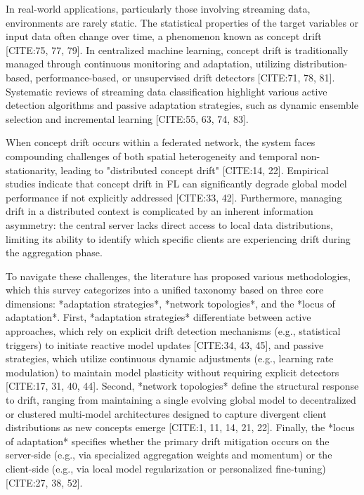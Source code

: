 \documentclass[journal]{IEEEtran}
\begin{document}
In real-world applications, particularly those involving streaming data, environments are rarely static. The statistical properties of the target variables or input data often change over time, a phenomenon known as concept drift [CITE:75, 77, 79]. In centralized machine learning, concept drift is traditionally managed through continuous monitoring and adaptation, utilizing distribution-based, performance-based, or unsupervised drift detectors [CITE:71, 78, 81]. Systematic reviews of streaming data classification highlight various active detection algorithms and passive adaptation strategies, such as dynamic ensemble selection and incremental learning [CITE:55, 63, 74, 83].

When concept drift occurs within a federated network, the system faces compounding challenges of both spatial heterogeneity and temporal non-stationarity, leading to "distributed concept drift" [CITE:14, 22]. Empirical studies indicate that concept drift in FL can significantly degrade global model performance if not explicitly addressed [CITE:33, 42]. Furthermore, managing drift in a distributed context is complicated by an inherent information asymmetry: the central server lacks direct access to local data distributions, limiting its ability to identify which specific clients are experiencing drift during the aggregation phase.

To navigate these challenges, the literature has proposed various methodologies, which this survey categorizes into a unified taxonomy based on three core dimensions: *adaptation strategies*, *network topologies*, and the *locus of adaptation*. First, *adaptation strategies* differentiate between active approaches, which rely on explicit drift detection mechanisms (e.g., statistical triggers) to initiate reactive model updates [CITE:34, 43, 45], and passive strategies, which utilize continuous dynamic adjustments (e.g., learning rate modulation) to maintain model plasticity without requiring explicit detectors [CITE:17, 31, 40, 44]. Second, *network topologies* define the structural response to drift, ranging from maintaining a single evolving global model to decentralized or clustered multi-model architectures designed to capture divergent client distributions as new concepts emerge [CITE:1, 11, 14, 21, 22]. Finally, the *locus of adaptation* specifies whether the primary drift mitigation occurs on the server-side (e.g., via specialized aggregation weights and momentum) or the client-side (e.g., via local model regularization or personalized fine-tuning) [CITE:27, 38, 52].
\end{document}
